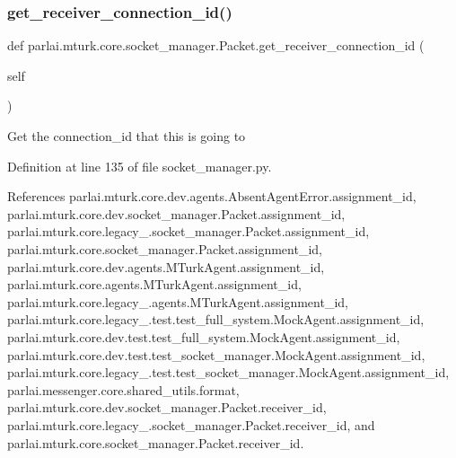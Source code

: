 \subsubsection{\texorpdfstring{get\+\_\+receiver\+\_\+connection\+\_\+id()}{get\_receiver\_connection\_id()}}
{\footnotesize\ttfamily def parlai.\+mturk.\+core.\+socket\+\_\+manager.\+Packet.\+get\+\_\+receiver\+\_\+connection\+\_\+id (\begin{DoxyParamCaption}\item[{}]{self }\end{DoxyParamCaption})}

\begin{DoxyVerb}Get the connection_id that this is going to\end{DoxyVerb}
 

Definition at line 135 of file socket\+\_\+manager.\+py.



References parlai.\+mturk.\+core.\+dev.\+agents.\+Absent\+Agent\+Error.\+assignment\+\_\+id, parlai.\+mturk.\+core.\+dev.\+socket\+\_\+manager.\+Packet.\+assignment\+\_\+id, parlai.\+mturk.\+core.\+legacy\+\_.\+socket\+\_\+manager.\+Packet.\+assignment\+\_\+id, parlai.\+mturk.\+core.\+socket\+\_\+manager.\+Packet.\+assignment\+\_\+id, parlai.\+mturk.\+core.\+dev.\+agents.\+M\+Turk\+Agent.\+assignment\+\_\+id, parlai.\+mturk.\+core.\+agents.\+M\+Turk\+Agent.\+assignment\+\_\+id, parlai.\+mturk.\+core.\+legacy\+\_.\+agents.\+M\+Turk\+Agent.\+assignment\+\_\+id, parlai.\+mturk.\+core.\+legacy\+\_.\+test.\+test\+\_\+full\+\_\+system.\+Mock\+Agent.\+assignment\+\_\+id, parlai.\+mturk.\+core.\+dev.\+test.\+test\+\_\+full\+\_\+system.\+Mock\+Agent.\+assignment\+\_\+id, parlai.\+mturk.\+core.\+dev.\+test.\+test\+\_\+socket\+\_\+manager.\+Mock\+Agent.\+assignment\+\_\+id, parlai.\+mturk.\+core.\+legacy\+\_.\+test.\+test\+\_\+socket\+\_\+manager.\+Mock\+Agent.\+assignment\+\_\+id, parlai.\+messenger.\+core.\+shared\+\_\+utils.\+format, parlai.\+mturk.\+core.\+dev.\+socket\+\_\+manager.\+Packet.\+receiver\+\_\+id, parlai.\+mturk.\+core.\+legacy\+\_.\+socket\+\_\+manager.\+Packet.\+receiver\+\_\+id, and parlai.\+mturk.\+core.\+socket\+\_\+manager.\+Packet.\+receiver\+\_\+id.

\mbox{\label{classparlai_1_1mturk_1_1core_1_1socket__manager_1_1Packet_ad472844f177969be64004bc0fd7031d9}} 
